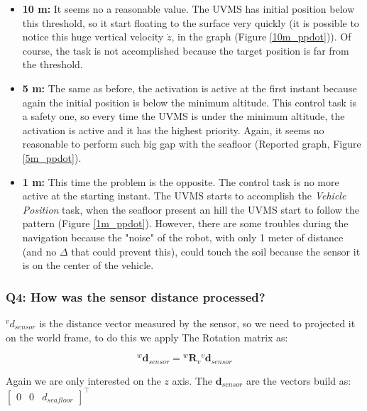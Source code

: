 \documentclass{article}
\begin{document}
\begin{itemize}
    \item \textbf{10 m:} It seems no a reasonable value. The UVMS has initial position below this threshold, so it start floating to the surface very quickly (it is possible to notice this huge vertical velocity $\dot{z}$, in the graph (Figure \ref{10m_ppdot})). Of course, the task is not accomplished because the target position is far from the threshold.
    \item \textbf{5 m:} The same as before, the activation is active at the first instant because again the initial position is below the minimum altitude. This control task is a safety one, so every time the UVMS is under the minimum altitude, the activation is active and it has the highest priority. Again, it seems no reasonable to perform such big gap with the seafloor (Reported graph, Figure \ref{5m_ppdot}).
    \item \textbf{1 m:} This time the problem is the opposite. The control task is no more active at the starting instant. The UVMS starts to accomplish the \textit{Vehicle Position} task, when the seafloor present an hill the UVMS start to follow the pattern (Figure \ref{1m_ppdot}). However, there are some troubles during the navigation because the "noise" of the robot, with only 1 meter of distance (and no $\Delta$ that could prevent this), could touch the soil because the sensor it is on the center of the vehicle.
\end{itemize}

\subsubsection{Q4: How was the sensor distance processed?}
 
 ${^{v}d_{sensor}}$ is the distance vector measured by the sensor, so we need to projected it on the world frame, to do this we apply The Rotation matrix as:
 
 \begin{equation}
     {^{w}\boldsymbol{d}_{sensor}} = {^{w}\boldsymbol{R}_{v}} {^{v}\boldsymbol{d}_{sensor}}
 \end{equation}
 
 \noindent
 Again we are only interested on the $z$ axis. The $\boldsymbol{d}_{sensor}$ are the vectors build as:
 $\begin{bmatrix}0 & 0 & d_{seafloor} \end{bmatrix}^\top$
\\ 
\end{document}
